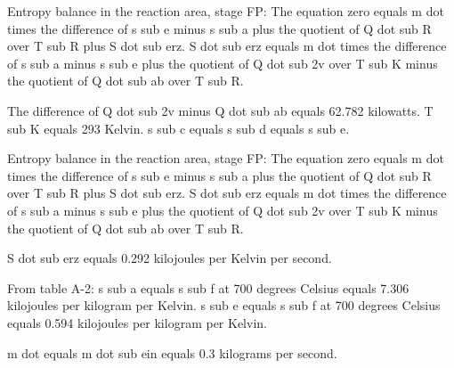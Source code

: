 Entropy balance in the reaction area, stage FP:
The equation zero equals m dot times the difference of s sub e minus s sub a plus the quotient of Q dot sub R over T sub R plus S dot sub erz.
S dot sub erz equals m dot times the difference of s sub a minus s sub e plus the quotient of Q dot sub 2v over T sub K minus the quotient of Q dot sub ab over T sub R.

The difference of Q dot sub 2v minus Q dot sub ab equals 62.782 kilowatts.
T sub K equals 293 Kelvin.
s sub c equals s sub d equals s sub e.

Entropy balance in the reaction area, stage FP:
The equation zero equals m dot times the difference of s sub e minus s sub a plus the quotient of Q dot sub R over T sub R plus S dot sub erz.
S dot sub erz equals m dot times the difference of s sub a minus s sub e plus the quotient of Q dot sub 2v over T sub K minus the quotient of Q dot sub ab over T sub R.

S dot sub erz equals 0.292 kilojoules per Kelvin per second.

From table A-2:
s sub a equals s sub f at 700 degrees Celsius equals 7.306 kilojoules per kilogram per Kelvin.
s sub e equals s sub f at 700 degrees Celsius equals 0.594 kilojoules per kilogram per Kelvin.

m dot equals m dot sub ein equals 0.3 kilograms per second.
